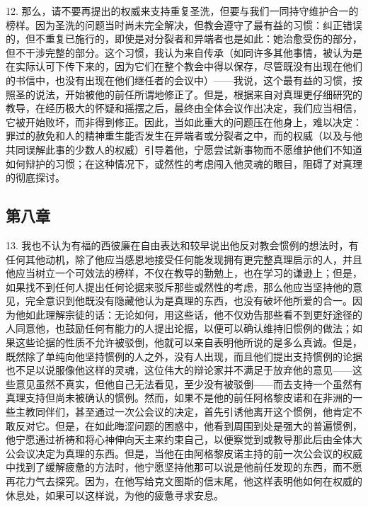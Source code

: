 12. 那么，请不要再提出的权威来支持重复圣洗，但要与我们一同持守维护合一的榜样。因为圣洗的问题当时尚未完全解决，但教会遵守了最有益的习惯：纠正错误的，但不重复已施行的，即使是对分裂者和异端者也是如此：她治愈受伤的部分，但不干涉完整的部分。这个习惯，我认为来自传承（如同许多其他事情，被认为是在实际认可下传下来的，因为它们在整个教会中得以保存，尽管既没有出现在他们的书信中，也没有出现在他们继任者的会议中）——我说，这个最有益的习惯，按照圣的说法，开始被他的前任所谓地修正了。但是，根据来自对真理更仔细研究的教导，在经历极大的怀疑和摇摆之后，最终由全体会议作出决定，我们应当相信，它被开始败坏，而非得到修正。因此，当如此重大的问题压在他身上，难以决定：罪过的赦免和人的精神重生能否发生在异端者或分裂者之中，而的权威（以及与他共同误解此事的少数人的权威）引导着他，宁愿尝试新事物而不愿维护他们不知道如何辩护的习惯；在这种情况下，或然性的考虑闯入他灵魂的眼目，阻碍了对真理的彻底探讨。\par


\subsection{第八章}

13. 我也不认为有福的西彼廉在自由表达和较早说出他反对教会惯例的想法时，有任何其他动机，除了他应当感恩地接受任何能发现拥有更完整真理启示的人，并且他应当树立一个可效法的榜样，不仅在教导的勤勉上，也在学习的谦逊上；但是，如果找不到任何人提出任何论据来驳斥那些或然性的考虑，那么他应当坚持他的意见，完全意识到他既没有隐藏他认为是真理的东西，也没有破坏他所爱的合一。因为他如此理解宗徒的话：无论如何，用这些话，他不仅劝告那些看不到更好途径的人同意他，也鼓励任何有能力的人提出论据，以便可以确认维持旧惯例的做法；如果这些论据的性质不允许被驳倒，他就可以亲自表明他所说的是多么真诚。但是，既然除了单纯向他坚持惯例的人之外，没有人出现，而且他们提出支持惯例的论据也不足以说服像他这样的灵魂，这位伟大的辩论家并不满足于放弃他的意见——这些意见虽然不真实，但他自己无法看见，至少没有被驳倒——而去支持一个虽然有真理支持但尚未被确认的惯例。然而，如果不是他的前任阿格黎皮诺和在非洲的一些主教同伴们，甚至通过一次公会议的决定，首先引诱他离开这个惯例，他肯定不敢反对它。但是，在如此晦涩问题的困惑中，他看到周围到处是强大的普遍惯例，他宁愿通过祈祷和将心神伸向天主来约束自己，以便察觉到或教导那此后由全体大公会议决定为真理的东西。但是，当他在由阿格黎皮诺主持的前一次公会议的权威中找到了缓解疲惫的方法时，他宁愿坚持他那可以说是他前任发现的东西，而不愿再花力气去探究。因为，在他写给克文图斯的信末尾，他这样表明他如何在权威的休息处，如果可以这样说，为他的疲惫寻求安息。\par

